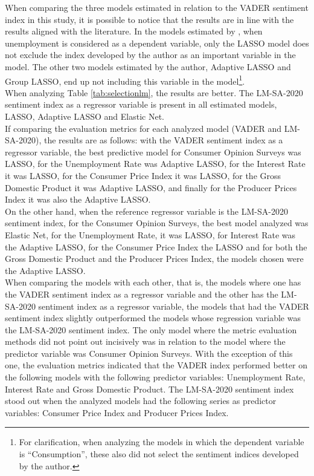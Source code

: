 When comparing the three models estimated in relation to the VADER sentiment index in this study, it is possible to notice that the results are in line with the results aligned with the literature. In the models estimated by \cite{shapiro2020measuring}, when unemployment is considered as a dependent variable, only the LASSO model does not exclude the index developed by the author as an important variable in the model. The other two models estimated by the author, Adaptive LASSO and Group LASSO, end up not including this variable in the model\footnote{For clarification, when analyzing the models in which the dependent variable is ``Consumption'', these also did not select the sentiment indices developed by the author.}.\\

When analyzing Table \ref{tab:selectionlm}, the results are better. The LM-SA-2020 sentiment index as a regressor variable is present in all estimated models, LASSO, Adaptive LASSO and Elastic Net.\\

If comparing the evaluation metrics for each analyzed model (VADER and LM-SA-2020), the results are as follows: with the VADER sentiment index as a regressor variable, the best predictive model for Consumer Opinion Surveys was LASSO, for the Unemployment Rate was Adaptive LASSO, for the Interest Rate it was LASSO, for the Consumer Price Index it was LASSO, for the Gross Domestic Product it was Adaptive LASSO, and finally for the Producer Prices Index it was also the Adaptive LASSO.\\

On the other hand, when the reference regressor variable is the LM-SA-2020 sentiment index, for the Consumer Opinion Surveys, the best model analyzed was Elastic Net, for the Unemployment Rate, it was LASSO, for Interest Rate was the Adaptive LASSO, for the Consumer Price Index the LASSO and for both the Gross Domestic Product and the Producer Prices Index, the models chosen were the Adaptive LASSO.\\

When comparing the models with each other, that is, the models where one has the VADER sentiment index as a regressor variable and the other has the LM-SA-2020 sentiment index as a regressor variable, the models that had the VADER sentiment index slightly outperformed the models whose regression variable was the LM-SA-2020 sentiment index. The only model where the metric evaluation methods did not point out incisively was in relation to the model where the predictor variable was Consumer Opinion Surveys. With the exception of this one, the evaluation metrics indicated that the VADER index performed better on the following models with the following predictor variables: Unemployment Rate, Interest Rate and Gross Domestic Product. The LM-SA-2020 sentiment index stood out when the analyzed models had the following series as predictor variables: Consumer Price Index and Producer Prices Index.\\

